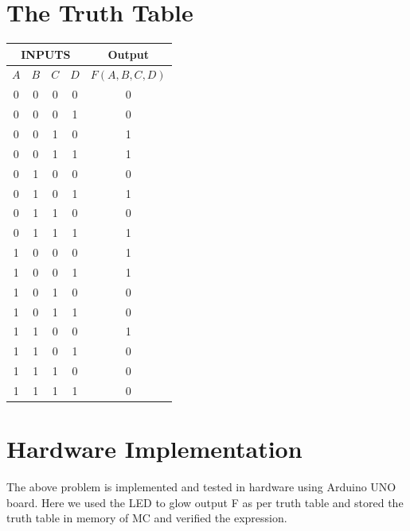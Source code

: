 \documentclass[a4paper,12pt]{article}
\begin{document}
\section*{\textbf{The Truth Table}}
\begin{center}
\begin{tabular}{|c|c|c|c|c|}
\hline
	\multicolumn{4}{|c|}{\textbf{INPUTS}} & \textbf{Output} \\ 
\hline
	$A$ & $B$ & $C$ & $D$ & $F(A,B,C,D)$ \\
\hline
0 & 0 & 0 & 0 & 0 \\ 
0 & 0 & 0 & 1 & 0 \\ 
0 & 0 & 1 & 0 & 1 \\ 
0 & 0 & 1 & 1 & 1 \\ 
0 & 1 & 0 & 0 & 0 \\ 
0 & 1 & 0 & 1 & 1 \\ 
0 & 1 & 1 & 0 & 0 \\ 
0 & 1 & 1 & 1 & 1 \\ 
1 & 0 & 0 & 0 & 1 \\ 
1 & 0 & 0 & 1 & 1 \\ 
1 & 0 & 1 & 0 & 0 \\ 
1 & 0 & 1 & 1 & 0 \\ 
1 & 1 & 0 & 0 & 1 \\ 
1 & 1 & 0 & 1 & 0 \\ 
1 & 1 & 1 & 0 & 0 \\ 
1 & 1 & 1 & 1 & 0 \\ 
\hline
\end{tabular}
\end{center}
\section*{\textbf{Hardware Implementation}}
The above problem is implemented and tested in hardware using Arduino UNO board. Here we used the LED to glow output F as per truth table and stored the truth table in memory of MC and verified the expression.
\end{document}

